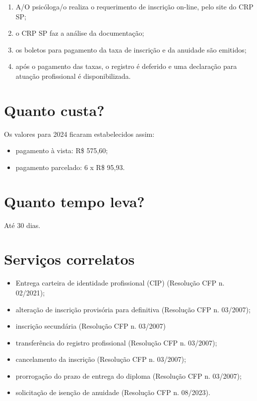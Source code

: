 \begin{enumerate}
\item	A/O psicóloga/o realiza o requerimento de inscrição on-line, pelo site do CRP SP;
\item	o CRP SP faz a análise da documentação;
\item	os boletos para pagamento da taxa de inscrição e da anuidade são emitidos;
\item	após o pagamento das taxas, o registro é deferido e uma declaração para atuação profissional é disponibilizada.
\end{enumerate}

\section*{Quanto custa?}

Os valores para 2024 ficaram estabelecidos assim:

\begin{itemize}
\item	pagamento à vista: R\$ 575,60;
\item	pagamento parcelado: 6 x R\$ 95,93.
\end{itemize}

\section*{Quanto tempo leva?}

Até 30 dias. 

\section*{Serviços correlatos}

\begin{itemize}
\item	Entrega carteira de identidade profissional (CIP) (Resolução CFP n. 02/2021);
\item	alteração de inscrição provisória para definitiva (Resolução CFP n. 03/2007);
\item	inscrição secundária (Resolução CFP n. 03/2007)
\item	transferência do registro profissional (Resolução CFP n. 03/2007);
\item	cancelamento da inscrição (Resolução CFP n. 03/2007);
\item	prorrogação do prazo de entrega do diploma  (Resolução CFP n. 03/2007);
\item	solicitação de isenção de anuidade (Resolução CFP n. 08/2023).
\end{itemize}

